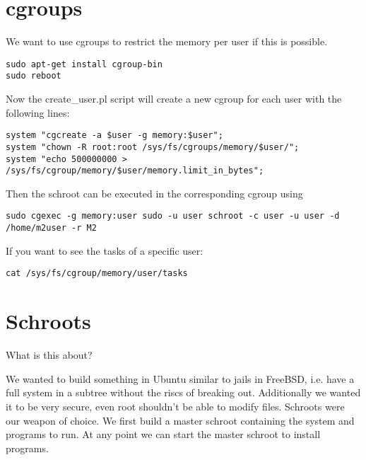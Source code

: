 \documentclass[a4paper]{book}
\begin{document}
\chapter{cgroups}
We want to use cgroups to restrict the memory per user if this is possible.
\begin{verbatim}
sudo apt-get install cgroup-bin 
sudo reboot
\end{verbatim}

Now the create\_user.pl script will create a new cgroup for each user with the following lines:
\begin{verbatim}
system "cgcreate -a $user -g memory:$user";
system "chown -R root:root /sys/fs/cgroups/memory/$user/";
system "echo 500000000 > /sys/fs/cgroup/memory/$user/memory.limit_in_bytes";
\end{verbatim}

Then the schroot can be executed in the corresponding cgroup using
\begin{verbatim}
sudo cgexec -g memory:user sudo -u user schroot -c user -u user -d /home/m2user -r M2
\end{verbatim}

If you want to see the tasks of a specific user:
\begin{verbatim}
cat /sys/fs/cgroup/memory/user/tasks
\end{verbatim}

\chapter{Schroots}
What is this about?

We wanted to build something in Ubuntu similar to jails in FreeBSD, i.e. have a
full system in a subtree without the riscs of breaking out.  Additionally we
wanted it to be very secure, even root shouldn't be able to modify files.
Schroots were our weapon of choice. We first build a master schroot containing
the system and programs to run. At any point we can start the master schroot to
install programs.
\end{document}
